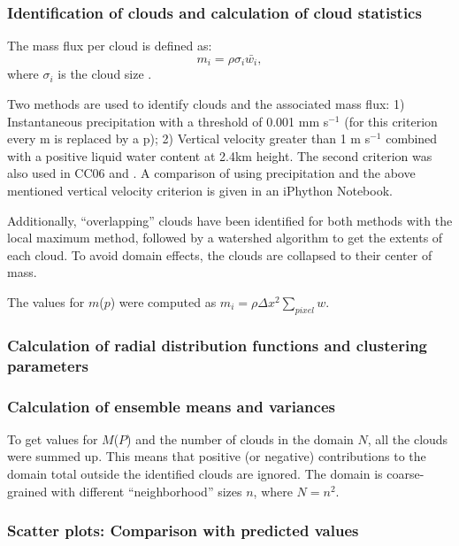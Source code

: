 \documentclass[a4paper, 12pt]{article}
\begin{document}
\subsubsection{Identification of clouds and calculation of cloud statistics}
The mass flux per cloud is defined as:
\begin{equation}
\label{eq:def_m}
 m_i = \rho \sigma_i \bar{w_i},
\end{equation}
where $\sigma_i$ is the cloud size \citep{Cohen2006}. 

Two methods are used to identify clouds and the associated mass flux: 1) Instantaneous precipitation with a threshold of 0.001 mm s$^{-1}$ (for this criterion every m is replaced by a p); 2) Vertical velocity greater than 1 m s$^{-1}$ combined with a positive liquid water content at 2.4km height. The second criterion was also used in CC06 and  \cite{Davoudi2010}. A comparison of using precipitation and the above mentioned vertical velocity criterion is given in an iPhython Notebook. 

Additionally, ``overlapping'' clouds have been identified for both methods with the local maximum method, followed by a watershed algorithm to get the extents of each cloud. To avoid domain effects, the clouds are collapsed to their center of mass. 

The values for $m$($p$) were computed as  $m_i = \rho \Delta x^2 \sum_{pixel} w$. 

\subsubsection{Calculation of radial distribution functions and clustering parameters}

\subsubsection{Calculation of ensemble means and variances}

To get values for $M$($P$) and the number of clouds in the domain $N$, all the clouds were summed up. This means that positive (or negative) contributions to the domain total outside the identified clouds are ignored. The domain is coarse-grained with different ``neighborhood'' sizes $n$, where $N = n^2$. 

\subsubsection{Scatter plots: Comparison with predicted values}
\end{document}
